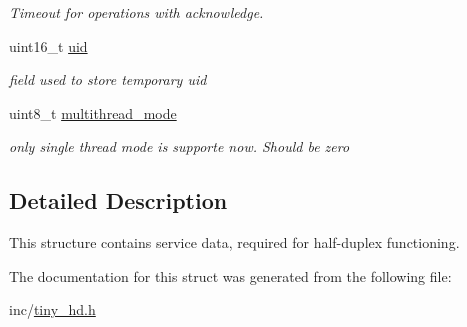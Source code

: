 \begin{DoxyCompactItemize}
\begin{DoxyCompactList}\small\item\em Timeout for operations with acknowledge. \end{DoxyCompactList}\item 
\hypertarget{structSTinyHdData___a7084eac08b744ad0aa2624b854866825}{}uint16\+\_\+t \hyperlink{structSTinyHdData___a7084eac08b744ad0aa2624b854866825}{uid}\label{structSTinyHdData___a7084eac08b744ad0aa2624b854866825}

\begin{DoxyCompactList}\small\item\em field used to store temporary uid \end{DoxyCompactList}\item 
\hypertarget{structSTinyHdData___a37dca10adb0dd210f02365b7fa20a598}{}uint8\+\_\+t \hyperlink{structSTinyHdData___a37dca10adb0dd210f02365b7fa20a598}{multithread\+\_\+mode}\label{structSTinyHdData___a37dca10adb0dd210f02365b7fa20a598}

\begin{DoxyCompactList}\small\item\em only single thread mode is supporte now. Should be zero \end{DoxyCompactList}\end{DoxyCompactItemize}


\subsection{Detailed Description}
This structure contains service data, required for half-\/duplex functioning. 

The documentation for this struct was generated from the following file\+:\begin{DoxyCompactItemize}
\item 
inc/\hyperlink{tiny__hd_8h}{tiny\+\_\+hd.\+h}\end{DoxyCompactItemize}
